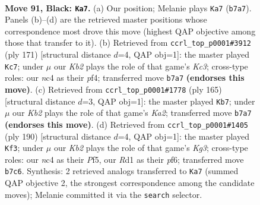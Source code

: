 \documentclass[11pt]{article}
\begin{document}
\clearpage

\begin{figure}[p]\centering
\begin{subfigure}{0.46\textwidth}\centering
\resizebox{\linewidth}{!}{%
\newchessgame
\chessboard[
  setfen={7R/1k6/8/5K2/2N5/8/6P1/3r4 b - - 47 91},
  showmover=false,
  pgfstyle=straightmove, color=movearrow, markmove={b7-a7}
]}
\caption{}
\end{subfigure}\hfill
\begin{subfigure}{0.46\textwidth}\centering
\resizebox{\linewidth}{!}{%
\newchessgame
\chessboard[
  setfen={3R4/6r1/2k1p3/8/5P2/8/2K5/8 b - - 0 86},
  showmover=false,
  pgfstyle=straightmove, color=movearrow, markmove={c6-c7}
]}
\caption{}
\end{subfigure}
\\[4pt]
\begin{subfigure}{0.46\textwidth}\centering
\resizebox{\linewidth}{!}{%
\newchessgame
\chessboard[
  setfen={8/k7/7R/p7/4N3/8/6r1/4K3 b - - 15 83},
  showmover=false,
  pgfstyle=straightmove, color=movearrow, markmove={a7-b7}
]}
\caption{}
\end{subfigure}\hfill
\begin{subfigure}{0.46\textwidth}\centering
\resizebox{\linewidth}{!}{%
\newchessgame
\chessboard[
  setfen={8/R7/5p1k/5P2/1r6/6K1/8/8 w - - 4 96},
  showmover=false,
  pgfstyle=straightmove, color=movearrow, markmove={g3-f3}
]}
\caption{}
\end{subfigure}
\caption{\textbf{Move 91, Black: \texttt{Ka7}.} (a) Our position; Melanie plays \texttt{Ka7} (\texttt{b7a7}). Panels (b)--(d) are the retrieved master positions whose correspondence most drove this move (highest QAP objective among those that transfer to it). (b) Retrieved from \texttt{ccrl\_top\_p0001\#3912} (ply 171) [structural distance $d$=4, QAP obj=1]: the master played \texttt{Kc7}; under $\mu$ our \emph{Kb2} plays the role of that game's \emph{Kc3}; cross-type roles: our \emph{n}c4 as their \emph{p}f4; transferred move \texttt{b7a7} \textbf{(endorses this move)}. (c) Retrieved from \texttt{ccrl\_top\_p0001\#1778} (ply 165) [structural distance $d$=3, QAP obj=1]: the master played \texttt{Kb7}; under $\mu$ our \emph{Kb2} plays the role of that game's \emph{Ka2}; transferred move \texttt{b7a7} \textbf{(endorses this move)}. (d) Retrieved from \texttt{ccrl\_top\_p0001\#1405} (ply 190) [structural distance $d$=4, QAP obj=1]: the master played \texttt{Kf3}; under $\mu$ our \emph{Kb2} plays the role of that game's \emph{Kg3}; cross-type roles: our \emph{n}c4 as their \emph{P}f5, our \emph{R}d1 as their \emph{p}f6; transferred move \texttt{b7c6}. Synthesis: 2 retrieved analogs transferred to \texttt{Ka7} (summed QAP objective 2, the strongest correspondence among the candidate moves); Melanie committed it via the \texttt{search} selector.}
\label{fig:thought-m181}
\end{figure}
\end{document}
